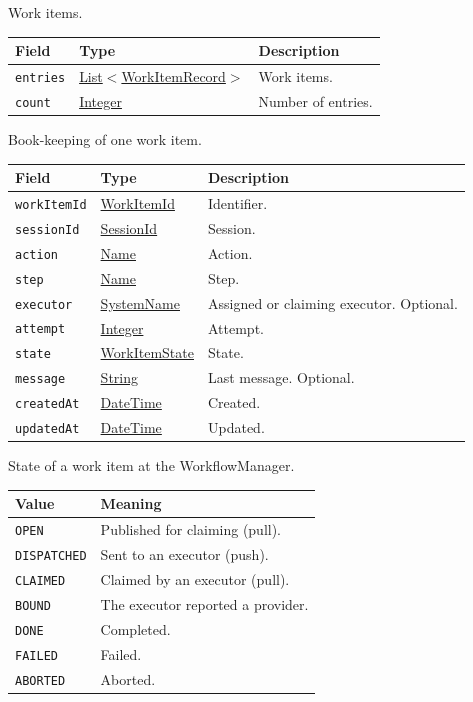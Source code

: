 \documentclass[a4paper]{arrowhead}
\newcommand{\mref}[1]{{\textcolor{ArrowheadPurple}{\hyperref[sec:model:#1]{#1}}}}
\newcommand{\pref}[1]{{\textcolor{ArrowheadGrey}{\hyperref[sec:model:primitives:#1]{#1}}}}
\begin{document}
Work items.

{\small
\begin{longtable}{|p{3.9cm}|p{4.4cm}|p{7.5cm}|}

\hline
\rowcolor{gray!33} Field & Type & Description \\ \hline
\endhead
\texttt{entries} & \pref{List}$<$\mref{WorkItemRecord}$>$ & Work items. \\ \hline
\texttt{count} & \pref{Integer} & Number of entries. \\ \hline
\end{longtable}
}

Book-keeping of one work item.

{\small
\begin{longtable}{|p{3.9cm}|p{4.4cm}|p{7.5cm}|}

\hline
\rowcolor{gray!33} Field & Type & Description \\ \hline
\endhead
\texttt{workItemId} & \pref{WorkItemId} & Identifier. \\ \hline
\texttt{sessionId} & \pref{SessionId} & Session. \\ \hline
\texttt{action} & \pref{Name} & Action. \\ \hline
\texttt{step} & \pref{Name} & Step. \\ \hline
\texttt{executor} & \pref{SystemName} & Assigned or claiming executor. Optional. \\ \hline
\texttt{attempt} & \pref{Integer} & Attempt. \\ \hline
\texttt{state} & \mref{WorkItemState} & State. \\ \hline
\texttt{message} & \pref{String} & Last message. Optional. \\ \hline
\texttt{createdAt} & \pref{DateTime} & Created. \\ \hline
\texttt{updatedAt} & \pref{DateTime} & Updated. \\ \hline
\end{longtable}
}

State of a work item at the WorkflowManager.

{\small
\begin{longtable}{|p{3.9cm}|p{11.9cm}|}

\hline
\rowcolor{gray!33} Value & Meaning \\ \hline
\endhead
\texttt{OPEN} & Published for claiming (pull). \\ \hline
\texttt{DISPATCHED} & Sent to an executor (push). \\ \hline
\texttt{CLAIMED} & Claimed by an executor (pull). \\ \hline
\texttt{BOUND} & The executor reported a provider. \\ \hline
\texttt{DONE} & Completed. \\ \hline
\texttt{FAILED} & Failed. \\ \hline
\texttt{ABORTED} & Aborted. \\ \hline
\end{longtable}
}
\end{document}

